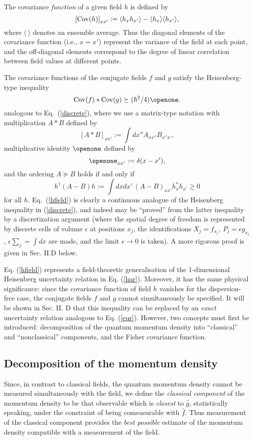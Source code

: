 \documentclass[a4paper,preprint, showpacs, aps, draft]{revtex4}
\begin{document}
{The covariance {\it function} of a given
field $h$ is defined by 
\begin{equation} \label{hcov}
\left[{\rm Cov}(h)\right]_{xx'} := 
\langle h_xh_{x'}\rangle -
\langle h_x\rangle \langle h_{x'}\rangle ,
\end{equation}
where $\langle ~\rangle$ denotes an ensemble average.
 Thus the diagonal elements of the covariance
function (i.e., $x=x'$) represent the
variance of the field at each point, and the
off-diagonal elements correspond to the degree of linear correlation
between field values at different points.  

The covariance functions of the conjugate fields $f$ and $g$ satisfy the 
Heisenberg-type inequality 
\begin{equation} \label{hfield}
{\rm Cov}(f) \ast {\rm Cov}(g) \succeq (\hbar^2/4)\openone .
\end{equation}
analogous to Eq.~(\ref{discrete}), 
where we use a matrix-type notation with multiplication $A\ast B$
defined
by
\[
\left[ A\ast B\right]_{x x'} := \int dx'' A_{x x''}B_{x'' x'} ,
\]
multiplicative identity $\openone$ defined by
\[
\openone_{xx'} := \delta(x-x') , \]
and the ordering $A\succeq B$ holds if and only if
\[
h^\dagger (A-B) h := \int dxdx'\,(A-B)_{xx'}h^*_{x}h_{x'} \geq 0 \]
for all $h$. 
Eq.~(\ref{hfield}) is clearly a continuous analogue of the Heisenberg
inequality in (\ref{discrete}), and indeed 
may be ``proved'' from the latter inequality by
a discretization argument (where the spatial degree of freedom is
represented by discrete cells of volume $\epsilon$ at positions $x_j$, 
the identifications $X_j=f_{x_j}$, $P_j=\epsilon g_{x_j}$,
$\epsilon\sum_j=\int dx$ are made, and
the limit $\epsilon\rightarrow 0$ is taken).  A more rigorous proof is
given in Sec. II.D below. 

Eq. (\ref{hfield}) represents a field-theoretic
generalisation of the 1-dimensional Heisenberg uncertainty relation in
Eq. (\ref{hur}).  Moreover, 
it has the same physical significance: since
the covariance function of field $h$ vanishes for the
dispersion-free case, the conjugate fields 
$f$ and $g$ cannot simultaneously be specified. It will be shown in Sec.
II. D that this inequality can be replaced by an {\it exact }uncertainty
relation analogous to Eq. (\ref{eur}).  However, two concepts must first
be introduced:  decomposition of the quantum momentum density into ``classical''
and ``nonclassical'' components, and the Fisher covariance function. 

\subsection{Decomposition of the momentum density}
Since, in contrast to classical fields, the quantum momentum density
cannot be measured simultaneously with the field, we define the {\it
classical component} of the momentum density to be that observable which
is {\it closest} to $\hat{g}$, statistically speaking, 
under the constraint of being
comeasurable with $\hat{f}$.  Thus measurement of the classical component
provides the {\it best possible} estimate of the momentum density 
compatible with a measurement of the field.

}
\end{document}
